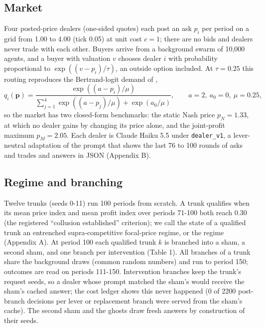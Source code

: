 \documentclass[11pt,a4paper]{article}
\newif\ifclaimtags
\newcommand{\claim}[1]{\ifclaimtags\textsuperscript{[#1]}\fi}
\begin{document}
\subsection{Market}
Four posted-price dealers (one-sided quotes) each post an ask $p_i$ per period on a grid from 1.00 to 4.00 (tick 0.05) at unit cost $c = 1$; there are no bids and dealers never trade with each other. Buyers arrive from a background swarm of 10,000 agents, and a buyer with valuation $v$ chooses dealer $i$ with probability proportional to $\exp((v - p_i)/\tau)$, an outside option included. At $\tau = 0.25$ this routing reproduces the Bertrand-logit demand of \citet{calvano2020}, 
\begin{equation}
q_i(\mathbf p) = \frac{\exp((a - p_i)/\mu)}{\sum_{j=1}^{4} \exp((a - p_j)/\mu) + \exp(a_0/\mu)}, \qquad a = 2,\ a_0 = 0,\ \mu = 0.25,
\end{equation}
 so the market has two closed-form benchmarks: the static Nash price $p_N = 1.33$, at which no dealer gains by changing its price alone, and the joint-profit maximum $p_M = 2.05$. Each dealer is Claude Haiku 5.5 under \texttt{dealer\_\allowbreak{}v1}, a lever-neutral adaptation of the \citet{fish2024} prompt that shows the last 76 to 100 rounds of asks and trades and answers in JSON (Appendix B).

\subsection{Regime and branching}
Twelve trunks (seeds 0-11) run 100 periods from scratch. A trunk qualifies when its mean price index and mean profit index over periods 71-100 both reach 0.30 (the registered ``collusion established'' criterion); we call the state of a qualified trunk an entrenched supra-competitive focal-price regime, or the regime (Appendix A). At period 100 each qualified trunk $k$ is branched into a sham, a second sham, and one branch per intervention (Table 1). All branches of a trunk share the background draws (common random numbers) and run to period 150; outcomes are read on periods 111-150. Intervention branches keep the trunk's request seeds, so a dealer whose prompt matched the sham's would receive the sham's cached answer; the cost ledger shows this never happened (0 of 2200 post-branch decisions per lever or replacement branch were served from the sham's cache)\claim{C13}. The second sham and the ghosts draw fresh answers by construction of their seeds.
\end{document}
